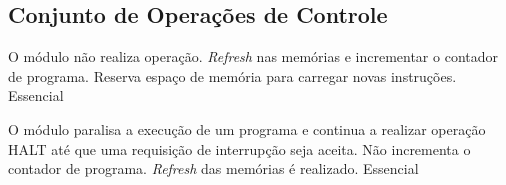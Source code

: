 \subsection{Conjunto de Operações de Controle}
	    
	\begin{functional}
		
		{O módulo não realiza operação. \textit{Refresh} nas memórias e incrementar o contador de programa. Reserva espaço de memória para carregar novas instruções.}
		{Essencial} 
       
        {O módulo paralisa a execução de um programa e continua a realizar operação HALT até que uma requisição de interrupção seja aceita. Não incrementa o contador de programa. \textit{Refresh} das memórias é realizado.}
        {Essencial}
 		
	  \end{functional}